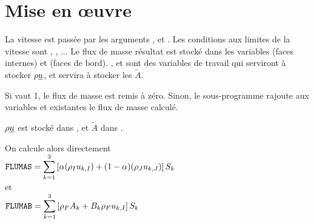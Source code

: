 %
% 
%
% 
% 
% 
%
%

\section{Mise en \oe uvre}

La vitesse est pass\'ee par les arguments ,  et . Les
conditions aux limites de la vitesse sont , , ... Le
flux de masse r\'esultat est stock\'e dans les variables  (faces
internes) et  (faces de bord). ,  et 
sont des variables de travail qui serviront \`a stocker $\rho\underline{u}$, et
 servira \`a stocker les $\tilde{A}$.

Si  vaut 1, le flux de masse est remis \`a z\'ero. Sinon, le
sous-programme rajoute aux variables  et  existantes le 
flux de masse calcul\'e.


$\rho\underline{u}$ est stock\'e dans , et $\tilde{A}$ dans .


On calcule alors directement\\
$\displaystyle \text{\texttt{FLUMAS}}=\sum\limits_{k=1}^{3}\left[
\alpha(\rho_I u_{k,I})+(1-\alpha)(\rho_J u_{k,J})\right]S_k$\\
et\\
$\displaystyle \text{\texttt{FLUMAB}}=\sum\limits_{k=1}^{3}\left[
\rho_F A_k + B_k\rho_Fu_{k,I}\right]S_k$


